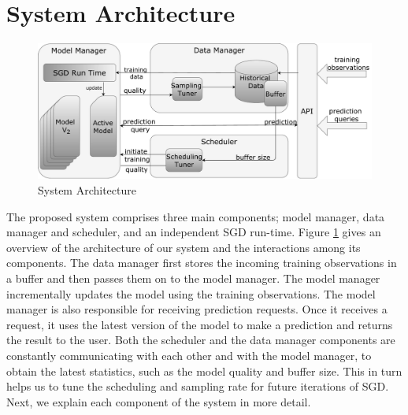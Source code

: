 \documentclass[10pt,conference,letterpaper]{IEEEtran}
\begin{document}
\section{System Architecture} \label{sec:system-architecutre}
\begin{figure}[t]
\centering
\includegraphics[width=\columnwidth]{../images/system-architecture-final.pdf}
\caption{System Architecture}
\label{fig:system-architecture}
\end{figure}

The proposed system comprises three main components; model manager, data manager and scheduler, and an independent SGD run-time. 
Figure \ref{fig:system-architecture} gives an overview of the architecture of our system and the interactions among its components.
The data manager first stores the incoming training observations in a buffer and then passes them on to the model manager.
The model manager incrementally updates the model using the training observations.
The model manager is also responsible for receiving prediction requests.
Once it receives a request, it uses the latest version of the model to make a prediction and returns the result to the user.
Both the scheduler and the data manager components are constantly communicating with each other and with the model manager, to obtain the latest statistics, such as the model quality and buffer size.
This in turn helps us to tune the scheduling and sampling rate for future iterations of SGD. 
Next, we explain each component of the system in more detail.
\end{document}
